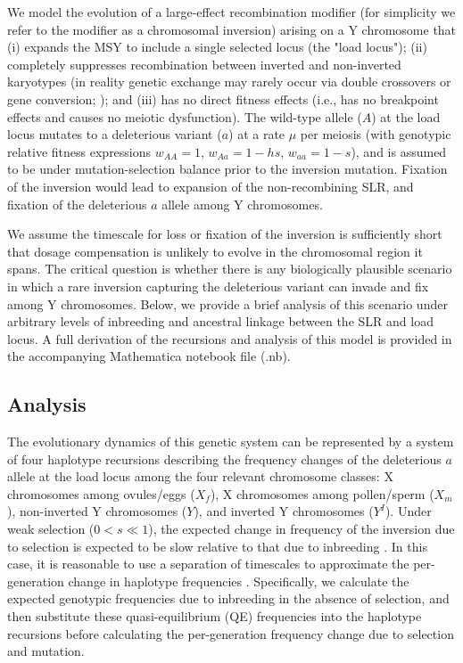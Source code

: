 \documentclass{article}
\begin{document}
\begin{appendices}
We model the evolution of a large-effect recombination modifier (for simplicity we refer to the modifier as a chromosomal inversion) arising on a Y chromosome that (i) expands the MSY to include a single selected locus (the "load locus"); (ii) completely suppresses recombination between inverted and non-inverted karyotypes (in reality genetic exchange may rarely occur via double crossovers or gene conversion; \citealt{KrimbasPowell1992, KorunesNoor2019}); and (iii) has no direct fitness effects (i.e., has no breakpoint effects and causes no meiotic dysfunction). The wild-type allele ($A$) at the load locus mutates to a deleterious variant ($a$) at a rate $\mu$ per meiosis (with genotypic relative fitness expressions $w_{AA} = 1$, $w_{Aa} = 1 - h s$, $w_{aa} = 1 - s$), and is assumed to be under mutation-selection balance prior to the inversion mutation. Fixation of the inversion would lead to expansion of the non-recombining SLR, and fixation of the deleterious $a$ allele among Y chromosomes.

We assume the timescale for loss or fixation of the inversion is sufficiently short that dosage compensation is unlikely to evolve in the chromosomal region it spans. The critical question is whether there is any biologically plausible scenario in which a rare inversion capturing the deleterious variant can invade and fix among Y chromosomes. Below, we provide a brief analysis of this scenario under arbitrary levels of inbreeding and ancestral linkage between the SLR and load locus. A full derivation of the recursions and analysis of this model is provided in the accompanying Mathematica notebook file (.nb).

\subsection{Analysis}

The evolutionary dynamics of this genetic system can be represented by a system of four haplotype recursions describing the frequency changes of the deleterious $a$ allele at the load locus among the four relevant chromosome classes: X chromosomes among ovules/eggs ($X_f$), X chromosomes among pollen/sperm ($X_m$), non-inverted Y chromosomes ($Y$), and inverted Y chromosomes ($Y^I$). Under weak selection ($0 < s \ll 1$), the expected change in frequency of the inversion due to selection is expected to be slow relative to that due to inbreeding \citep{CaballeroHill1992, JordanConnallon2014, Olito2017}. In this case, it is reasonable to use a separation of timescales to approximate the per-generation change in haplotype frequencies \cite{OttoDay2007}. Specifically, we calculate the expected genotypic frequencies due to inbreeding in the absence of selection, and then substitute these quasi-equilibrium (QE) frequencies into the haplotype recursions before calculating the per-generation frequency change due to selection and mutation.


\end{appendices}
\end{document}

